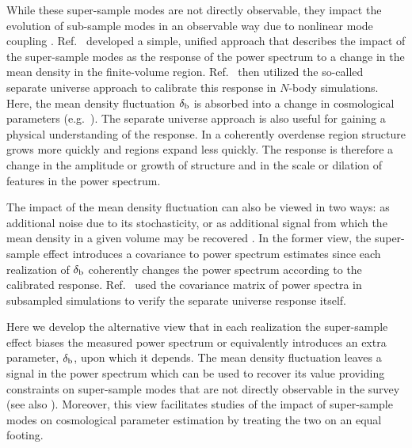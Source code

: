 \documentclass[prd,twocolumn,amsmath,amssymb,floatfix,superscriptaddress]{revtex4-1}
\newcommand{\br}{{\rm b}}
\begin{document}
  While these super-sample modes are not
directly observable, they impact the evolution of sub-sample modes in an
observable way due to nonlinear mode coupling
\citep{Hamiltonetal:06,Sefusattietal:06,HuKravtsov:03,TakadaBridle:07,TakadaJain:09,Satoetal:09,Takahashietal:09,dePutter:2011ah,Schneider:2011wf,Kayoetal:13,TakadaSpergel:13,Takada:2013wfa,Lietal:14,Schaanetal:14}.
Ref.~\cite{Takada:2013wfa} developed a simple, unified approach that describes
 the impact of the super-sample modes as the response of the power spectrum to a change in
the mean density in the finite-volume region.  Ref.~\cite{Lietal:14} then utilized
the so-called {separate universe approach} to calibrate this response in $N$-body simulations.   Here,  the mean density fluctuation $\delta_\br$ is
absorbed into   a change in cosmological
parameters
{(e.g.~\cite{TormenBertschinger:96,Cole:97,Sirko:05,Baldauf:2011bh,Gnedin:2011kj}).}    The separate universe approach
 is also useful for gaining a physical understanding of the response.  In a coherently overdense region structure grows more quickly and regions expand less quickly.   The response is
 therefore a change in the amplitude or growth of structure and in the scale or dilation
 of features in the power spectrum.
 
 The impact of the mean density fluctuation can also be viewed in two ways: as additional
 noise due to its stochasticity, or as additional signal from which the mean density in
 a given volume may be recovered \cite{Takada:2013wfa}.     In the former view, 
 the super-sample effect introduces a covariance to power spectrum estimates since
 each realization of  $\delta_\br$ coherently changes the power spectrum
 according to the calibrated response.   Ref.~\cite{Lietal:14} used the covariance
 matrix of power spectra in  subsampled simulations to verify the separate universe
 response itself.    
 
 Here we develop the alternative view that in each realization the
 super-sample effect biases the measured power spectrum or equivalently introduces
 an extra parameter, $\delta_\br$, upon which it depends.
 The mean density fluctuation leaves a signal in the power spectrum
 which can be used to recover its value providing constraints on super-sample modes
 that are not directly observable in the survey {(see also
 \cite{TakadaSpergel:13,Chiangetal:14}).}  
Moreover, this view facilitates studies
 of the impact of super-sample modes on cosmological parameter estimation by treating
 the two on an equal footing.
\end{document}
